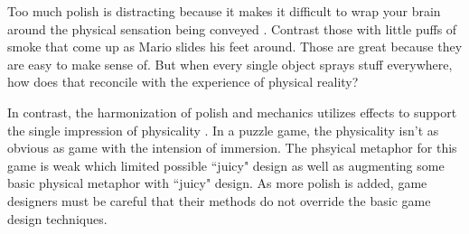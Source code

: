 Too much polish is distracting because it makes it difficult to wrap your brain around the physical sensation being conveyed \cite{swink2009game}. Contrast those with little puffs of smoke that come up as Mario slides his feet around. Those are great because they are easy to make sense of. But when every single object sprays stuff everywhere, how does that reconcile with the experience of physical reality?

In contrast, the harmonization of polish and mechanics utilizes effects to support the single impression of physicality \cite{swink2009game}. In a puzzle game, the physicality isn't as obvious as game with the intension of immersion. The phsyical metaphor for this game is weak which limited possible ``juicy" design as well as augmenting some basic physical metaphor with ``juicy" design. As more polish is added, game designers must be careful that their methods do not override the basic game design techniques.
